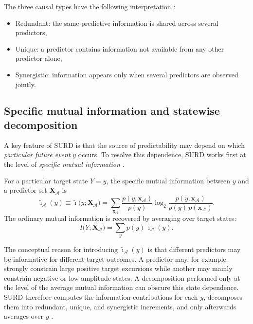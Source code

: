 \documentclass[12pt, a4paper]{article}
\begin{document}
The three causal types have the following interpretation \cite{MartinezSanchez2024SURD}:
\begin{itemize}
\item{Redundant:}  
the same predictive information is shared across several predictors,\\
\item{Unique:}  
a predictor contains information not available from any other predictor alone,\\
\item {Synergistic:}  
information appears only when several predictors are observed jointly.
\end{itemize}

\subsection{Specific mutual information and statewise decomposition}

A key feature of SURD is that the source of predictability may depend on which \emph{particular future event} \(y\) occurs. To resolve this dependence, SURD works first at the level of \emph{specific mutual information} \cite{DeWeeseMeister1999,Butts2003,MartinezSanchez2024SURD}.

For a particular target state \(Y=y\), the specific mutual information between \(y\) and a predictor set \(\mathbf{X}_{\mathcal{A}}\) is
\begin{equation}
\tilde{\imath}_{\mathcal{A}}(y)
\equiv
\tilde{\imath}\bigl(y;\mathbf{X}_{\mathcal{A}}\bigr)
=
\sum_{\mathbf{x}_{\mathcal{A}}}
\frac{p(y,\mathbf{x}_{\mathcal{A}})}{p(y)}
\log_2
\frac{p(y,\mathbf{x}_{\mathcal{A}})}{p(y)\,p(\mathbf{x}_{\mathcal{A}})}.
\label{eq:specific_mi}
\end{equation}
The ordinary mutual information is recovered by averaging over target states:
\begin{equation}
I\bigl(Y;\mathbf{X}_{\mathcal{A}}\bigr)
=
\sum_{y} p(y)\,\tilde{\imath}_{\mathcal{A}}(y).
\label{eq:mi_from_specific}
\end{equation}

The conceptual reason for introducing \(\tilde{\imath}_{\mathcal{A}}(y)\) is that different predictors may be informative for different target outcomes. A predictor may, for example, strongly constrain large positive target excursions while another may mainly constrain negative or low-amplitude states. A decomposition performed only at the level of the average mutual information can obscure this state dependence. SURD therefore computes the information contributions for each \(y\), decomposes them into redundant, unique, and synergistic increments, and only afterwards averages over \(y\) \cite{MartinezSanchez2024SURD}.
\end{document}
